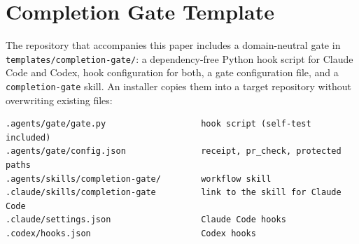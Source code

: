 \documentclass[11pt]{article}
\begin{document}
\section{Completion Gate Template}
The repository that accompanies this paper includes a domain-neutral gate in \nolinkurl{templates/completion-gate/}: a dependency-free Python hook script for Claude Code and Codex, hook configuration for both, a gate configuration file, and a \texttt{completion-gate} skill. An installer copies them into a target repository without overwriting existing files:

\begin{verbatim}
.agents/gate/gate.py                   hook script (self-test included)
.agents/gate/config.json               receipt, pr_check, protected paths
.agents/skills/completion-gate/        workflow skill
.claude/skills/completion-gate         link to the skill for Claude Code
.claude/settings.json                  Claude Code hooks
.codex/hooks.json                      Codex hooks
\end{verbatim}



\end{document}

